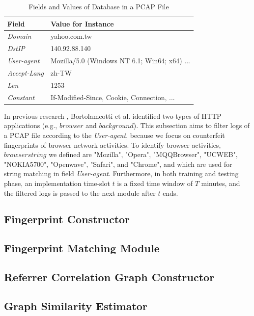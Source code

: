 \begin{table}[]
\centering
\caption{Fields and Values of Database in a PCAP File}
\label{tbl:log_01}
\begin{tabular}{ll}
\hline\hline
Field                           & Value for Instance                                               \\\hline
{\em Domain}            & yahoo.com.tw                                                      \\
{\em DstIP}                & 140.92.88.140                                                     \\
{\em User-agent}      & Mozilla/5.0 (Windows NT 6.1; Win64; x64) ...  \\
{\em Accept-Lang}   & zh-TW                                                                  \\
{\em Len}                   & 1253                                                                     \\
{\em Constant}          & If-Modified-Since, Cookie, Connection, ...       \\\hline\hline
\end{tabular}
\end{table}

In previous research \cite{bortolameotti2017decanter}, Bortolameotti et al. identified two types of HTTP applications (e.g., $browser$ and $background$). This subsection aims to filter logs of a PCAP file according to the {\em User-agent}, because we focus on counterfeit fingerprints of browser network activities. To identify browser activities, $browser string$ we defined are "Mozilla", "Opera", "MQQBrowser", "UCWEB",  "NOKIA5700", "Openwave", "Safari", and "Chrome", and which are used for string matching in field {\em User-agent}. Furthermore, in both training and testing phase, an implementation time-slot $t$ is a fixed time window of $T$ minutes, and the filtered logs is passed to the next module after $t$ ends.

\subsection{Fingerprint Constructor}

\subsection{Fingerprint Matching Module}

\subsection{Referrer Correlation Graph Constructor}

\subsection{Graph Similarity Estimator}